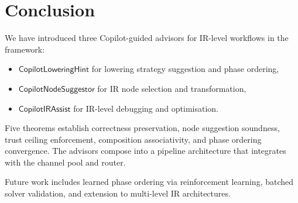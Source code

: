 \documentclass[11pt]{article}
\newcommand{\LowHint}{\mathsf{CopilotLoweringHint}}
\newcommand{\NodeSugg}{\mathsf{CopilotNodeSuggestor}}
\newcommand{\IRAssist}{\mathsf{CopilotIRAssist}}
\begin{document}
\section{Conclusion}\label{sec:conclusion}

We have introduced three Copilot-guided advisors for
IR-level workflows in the \JuGeo{} framework:
\begin{itemize}
\item $\LowHint$ for lowering strategy suggestion and
      phase ordering,
\item $\NodeSugg$ for IR node selection and transformation,
\item $\IRAssist$ for IR-level debugging and optimisation.
\end{itemize}
Five theorems establish correctness preservation, node
suggestion soundness, trust ceiling enforcement,
composition associativity, and phase ordering convergence.
The advisors compose into a pipeline architecture that
integrates with the channel pool and router.

Future work includes learned phase ordering via
reinforcement learning, batched solver validation,
and extension to multi-level IR architectures.
\end{document}
